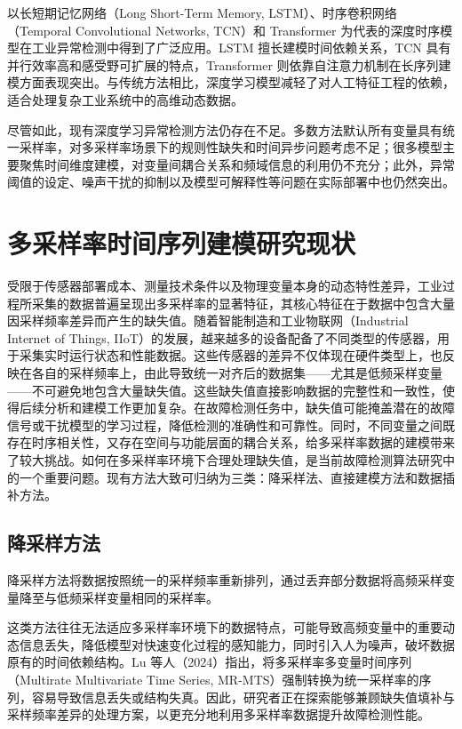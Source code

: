\documentclass[bachelor, vlined]{DissertUESTC}
\begin{document}
    以长短期记忆网络（Long Short-Term Memory, LSTM）、时序卷积网络（Temporal Convolutional Networks, TCN）和 Transformer 为代表的深度时序模型在工业异常检测中得到了广泛应用。LSTM 擅长建模时间依赖关系，TCN 具有并行效率高和感受野可扩展的特点，Transformer 则依靠自注意力机制在长序列建模方面表现突出。与传统方法相比，深度学习模型减轻了对人工特征工程的依赖，适合处理复杂工业系统中的高维动态数据。

    尽管如此，现有深度学习异常检测方法仍存在不足。多数方法默认所有变量具有统一采样率，对多采样率场景下的规则性缺失和时间异步问题考虑不足；很多模型主要聚焦时间维度建模，对变量间耦合关系和频域信息的利用仍不充分；此外，异常阈值的设定、噪声干扰的抑制以及模型可解释性等问题在实际部署中也仍然突出。
	
	\section{多采样率时间序列建模研究现状}

    受限于传感器部署成本、测量技术条件以及物理变量本身的动态特性差异，工业过程所采集的数据普遍呈现出多采样率的显著特征，其核心特征在于数据中包含大量因采样频率差异而产生的缺失值。随着智能制造和工业物联网（Industrial Internet of Things, IIoT）的发展，越来越多的设备配备了不同类型的传感器，用于采集实时运行状态和性能数据。这些传感器的差异不仅体现在硬件类型上，也反映在各自的采样频率上，由此导致统一对齐后的数据集——尤其是低频采样变量——不可避免地包含大量缺失值。这些缺失值直接影响数据的完整性和一致性，使得后续分析和建模工作更加复杂。在故障检测任务中，缺失值可能掩盖潜在的故障信号或干扰模型的学习过程，降低检测的准确性和可靠性。同时，不同变量之间既存在时序相关性，又存在空间与功能层面的耦合关系，给多采样率数据的建模带来了较大挑战。如何在多采样率环境下合理处理缺失值，是当前故障检测算法研究中的一个重要问题。现有方法大致可归纳为三类：降采样法、直接建模方法和数据插补方法。

    \subsection{降采样方法}

    降采样方法将数据按照统一的采样频率重新排列，通过丢弃部分数据将高频采样变量降至与低频采样变量相同的采样率。

    这类方法往往无法适应多采样率环境下的数据特点，可能导致高频变量中的重要动态信息丢失，降低模型对快速变化过程的感知能力，同时引入人为噪声，破坏数据原有的时间依赖结构。Lu 等人（2024）指出，将多采样率多变量时间序列（Multirate Multivariate Time Series, MR-MTS）强制转换为统一采样率的序列，容易导致信息丢失或结构失真。因此，研究者正在探索能够兼顾缺失值填补与采样频率差异的处理方案，以更充分地利用多采样率数据提升故障检测性能。
\end{document}
